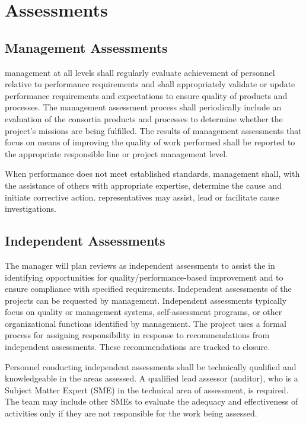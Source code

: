 \section{Assessments}

\subsection{Management Assessments}

 management at all levels shall regularly evaluate
achievement of personnel relative to performance requirements and
shall appropriately validate or update performance requirements and
expectations to ensure quality of products and processes. The
management assessment process shall periodically include an evaluation
of the consortia products and processes to determine whether the
project's missions are being fulfilled. The results of management
assessments that focus on means of improving the quality of work
performed shall be reported to the appropriate responsible line or
project management level.

When performance does not meet established standards, management
shall, with the assistance of others with appropriate expertise,
determine the cause and initiate corrective action. 
representatives may assist, lead or facilitate cause investigations.

\subsection{Independent Assessments}

The   manager will plan reviews as
independent assessments to assist the   in
identifying opportunities for quality/performance-based improvement
and to ensure compliance with specified requirements. Independent
assessments of the  projects can be requested by
 management. Independent assessments typically focus on
quality or  management systems, self-assessment programs, or
other organizational functions identified by management. The
 project uses a formal process for assigning
responsibility in response to recommendations from independent
assessments. These recommendations are tracked to closure.

Personnel conducting independent assessments shall be technically
qualified and knowledgeable in the areas assessed. A qualified lead
assessor (auditor), who is a Subject Matter Expert (SME) in the
technical area of assessment, is required. The team may include other
SMEs to evaluate the adequacy and effectiveness of activities only if
they are not responsible for the work being assessed.

